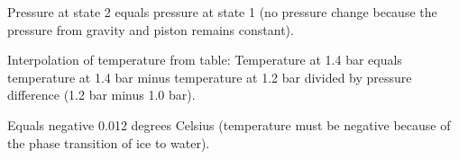 Pressure at state 2 equals pressure at state 1 (no pressure change because the pressure from gravity and piston remains constant).  

Interpolation of temperature from table:  
Temperature at 1.4 bar equals temperature at 1.4 bar minus temperature at 1.2 bar divided by pressure difference (1.2 bar minus 1.0 bar).  

Equals negative 0.012 degrees Celsius (temperature must be negative because of the phase transition of ice to water).